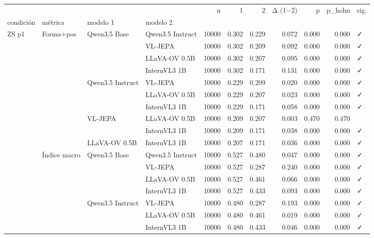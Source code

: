 \begin{tabular}{llllrrrrrrl}
\toprule
 &  &  &  & n & 1 & 2 & Δ (1−2) & p & p\_holm & sig. \\
condición & métrica & modelo 1 & modelo 2 &  &  &  &  &  &  &  \\
\midrule
\multirow[t]{20}{*}{ZS p1} & \multirow[t]{10}{*}{Forma+pos} & \multirow[t]{4}{*}{Qwen3.5 Base} & Qwen3.5 Instruct & 10000 & 0.302 & 0.229 & 0.072 & 0.000 & 0.000 & ✓ \\
 &  &  & VL-JEPA & 10000 & 0.302 & 0.209 & 0.092 & 0.000 & 0.000 & ✓ \\
 &  &  & LLaVA-OV 0.5B & 10000 & 0.302 & 0.207 & 0.095 & 0.000 & 0.000 & ✓ \\
 &  &  & InternVL3 1B & 10000 & 0.302 & 0.171 & 0.131 & 0.000 & 0.000 & ✓ \\
\cline{3-11}
 &  & \multirow[t]{3}{*}{Qwen3.5 Instruct} & VL-JEPA & 10000 & 0.229 & 0.209 & 0.020 & 0.000 & 0.000 & ✓ \\
 &  &  & LLaVA-OV 0.5B & 10000 & 0.229 & 0.207 & 0.023 & 0.000 & 0.000 & ✓ \\
 &  &  & InternVL3 1B & 10000 & 0.229 & 0.171 & 0.058 & 0.000 & 0.000 & ✓ \\
\cline{3-11}
 &  & \multirow[t]{2}{*}{VL-JEPA} & LLaVA-OV 0.5B & 10000 & 0.209 & 0.207 & 0.003 & 0.470 & 0.470 &  \\
 &  &  & InternVL3 1B & 10000 & 0.209 & 0.171 & 0.038 & 0.000 & 0.000 & ✓ \\
\cline{3-11}
 &  & LLaVA-OV 0.5B & InternVL3 1B & 10000 & 0.207 & 0.171 & 0.036 & 0.000 & 0.000 & ✓ \\
\cline{2-11} \cline{3-11}
 & \multirow[t]{10}{*}{Índice macro} & \multirow[t]{4}{*}{Qwen3.5 Base} & Qwen3.5 Instruct & 10000 & 0.527 & 0.480 & 0.047 & 0.000 & 0.000 & ✓ \\
 &  &  & VL-JEPA & 10000 & 0.527 & 0.287 & 0.240 & 0.000 & 0.000 & ✓ \\
 &  &  & LLaVA-OV 0.5B & 10000 & 0.527 & 0.461 & 0.066 & 0.000 & 0.000 & ✓ \\
 &  &  & InternVL3 1B & 10000 & 0.527 & 0.433 & 0.093 & 0.000 & 0.000 & ✓ \\
\cline{3-11}
 &  & \multirow[t]{3}{*}{Qwen3.5 Instruct} & VL-JEPA & 10000 & 0.480 & 0.287 & 0.193 & 0.000 & 0.000 & ✓ \\
 &  &  & LLaVA-OV 0.5B & 10000 & 0.480 & 0.461 & 0.019 & 0.000 & 0.000 & ✓ \\
 &  &  & InternVL3 1B & 10000 & 0.480 & 0.433 & 0.046 & 0.000 & 0.000 & ✓ \\

\end{tabular}
